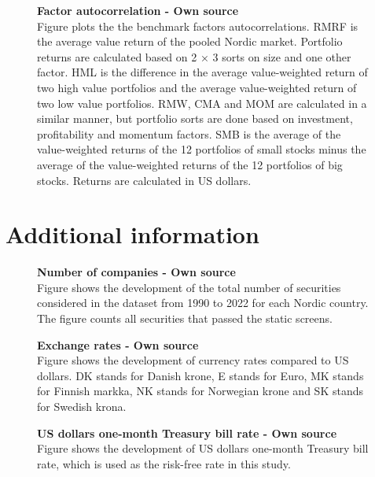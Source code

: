 \documentclass[12pt]{article}
\begin{document}
\begin{appendices}
\begin{figure}[H]
\centering
\caption[Factor autocorrelation]{\textbf{Factor autocorrelation \textnormal{- Own source}}\\ Figure plots the the benchmark factors autocorrelations. RMRF is the average value return of the pooled Nordic market. Portfolio returns are calculated based on 2 × 3 sorts on size and one other factor. HML is the difference in the average value-weighted return of two high value portfolios and the average value-weighted return of two low value portfolios. RMW, CMA and MOM are calculated in a similar manner, but portfolio sorts are done based on investment, profitability and momentum factors. SMB is the average of the value-weighted returns of the 12 portfolios of small stocks minus the average of the value-weighted returns of the 12 portfolios of big stocks. Returns are calculated in US dollars.}

\label{plot:factor_autocorrelation}
\end{figure}

\clearpage

\section{Additional information}
\renewcommand{\thefigure}{C.\arabic{figure}}
\setcounter{figure}{0}
\renewcommand{\thetable}{C.\arabic{table}}
\setcounter{table}{0}

\begin{figure}[H]
\centering
\caption[Number of companies]{\textbf{Number of companies \textnormal{- Own source}}\\ Figure shows the development of the total number of securities considered in the dataset from 1990 to 2022 for each Nordic country. The figure counts all securities that passed the static screens.}

\label{plot:number_of_companies}
\end{figure}

\begin{figure}[H]
\centering
\caption[Exchange rates]{\textbf{Exchange rates \textnormal{- Own source}}\\ Figure shows the development of currency rates compared to US dollars. DK stands for  Danish krone, E stands for Euro, MK stands for Finnish markka, NK stands for Norwegian krone and SK stands for Swedish krona.}

\label{plot:fx_rates}
\end{figure}

\begin{figure}[H]
\centering
\caption[US dollar one-month Treasury bill rate]{\textbf{US dollars one-month Treasury bill rate \textnormal{- Own source}}\\ Figure shows the development of US dollars one-month Treasury bill rate, which is used as the risk-free rate in this study.}

\label{plot:rf_ts}
\end{figure}


\end{appendices}
\end{document}
